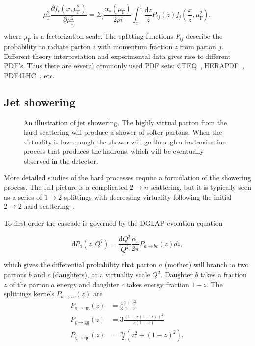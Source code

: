 \begin{equation}
\mu_\mathrm{F}^2 \frac{\partial f_i\left(x,\mu_{\mathrm{F}}^2 \right)}{\partial \mu_{\mathrm{F}}^2} = \Sigma_j \frac{\alpha_s\left(\mu_{\mathrm{F}}\right)}{2{pi}} \int _x^1 \frac{\mathrm{d}z}{z} P_{ij}(z) f_j\left(\frac{x}{z},\mu_{\mathrm{F}}^2\right),
\label{eq:dglap}
\end{equation}



\noindent where $\mu_{\mathrm{F}}$ is a factorization scale. The splitting functions $P_{ij}$ describe the probability to radiate parton $i$ with momentum fraction $z$ from parton $j$. Different theory interpretation and experimental data gives rise to different PDF's. Thus there are several commonly used PDF sets: CTEQ~\cite{cteq}, HERAPDF~\cite{CooperSarkar:2011aa}, PDF4LHC~\cite{Butterworth:2015oua}, etc. %

\subsection{Jet showering}
\label{sec:shower}
\begin{figure}
\centering

\caption[Jet showering]{An illustration of jet showering. The highly virtual parton from the hard scattering will produce a shower of softer partons. When the virtuality is low enough the shower will go through a hadronisation process that produces the hadrons, which will be eventually observed in the detector. }
\label{fig:showering}
\end{figure}

More detailed studies of the hard processes require a formulation of the showering process. The full picture is a complicated $2\rightarrow n$ scattering, but it is typically seen as a series of $1\rightarrow2$ splittings with decreasing virtuality following the initial $2\rightarrow 2$ hard scattering~\cite{newPythiaShower}.

To first order the cascade is governed by the DGLAP evolution equation~\cite{Gribov:1972ri,Altarelli:1977zs,Dokshitzer:1977sg}

\begin{equation}
\mathrm{d} P_a\left(z,Q^2\right) = \frac{\mathrm{d}Q^2}{Q^2}\frac{\alpha_s}{2\pi} P_{a\rightarrow bc}\left(z\right)dz,
\label{eq:dglap}
\end{equation} 

\noindent which gives the differential probability that parton $a$ (mother) will branch to two partons $b$ and $c$ (daughters), at a virtuality scale $Q^2$. Daughter $b$ takes a fraction $z$ of the parton $a$ energy and daughter $c$ takes energy fraction $1-z$. The splittings kernels $P_{a\rightarrow bc}\left(z\right)$ are 
\nopagebreak
\begin{align}
P_\mathrm{q\rightarrow qg}\left(z\right) &= \frac{4}{3}\frac{1+z^2}{1-z} \\
P_\mathrm{g\rightarrow gg}\left(z\right) &= 3\frac{\left(1-z\left(1-z \right) \right)^2}{z\left(1-z\right)} \\
P_\mathrm{g\rightarrow q \bar q}\left(z\right)& = \frac{n_f}{2}\left( z^2+\left(1-z\right)^2\right),
\end{align}

